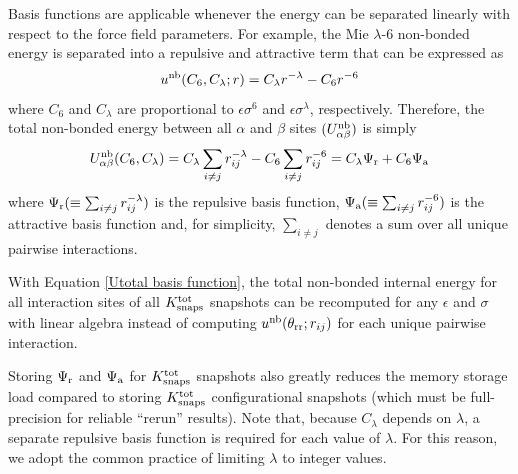 \documentclass[journal=jced,manuscript=article]{achemso}
\begin{document}
Basis functions are applicable whenever the energy can be separated linearly with respect to the force field parameters. For example, the Mie $\lambda$-6 non-bonded energy is separated into a repulsive and attractive term that can be expressed as
\begin{equation} \label{Mie basis function}
u^{\rm nb}(C_6,C_\lambda;r) = C_\lambda r^{-\lambda} - C_6 r^{-6}
\end{equation} 
where $C_6$ and $C_\lambda$ are proportional to $\epsilon \sigma^6$ and $\epsilon \sigma^\lambda$, respectively. Therefore, the total non-bonded energy between all $\alpha$ and $\beta$ sites $(U_{\alpha\beta}^{\rm nb})$ is simply
\begin{equation} \label{Utotal basis function}
U_{\alpha\beta}^{\rm nb}(C_6,C_\lambda) = C_\lambda \sum_{i \neq j} r_{ij}^{-\lambda} - C_6 \sum_{i \neq j} r_{ij}^{-6} = C_\lambda \Psi_{\rm r} + C_6 \Psi_{\rm a}
\end{equation}
where $\Psi_{\rm r} (\equiv \sum_{i \neq j} r_{ij}^{-\lambda})$ is the repulsive basis function, $\Psi_{\rm a} (\equiv \sum_{i \neq j} r_{ij}^{-6})$ is the attractive basis function and, for simplicity, $\sum_{i \neq j}$ denotes a sum over all unique pairwise interactions.

With Equation \ref{Utotal basis function}, the total non-bonded internal energy for all interaction sites of all $K^{\rm tot}_{\rm snaps}$ snapshots can be recomputed for any $\epsilon$ and $\sigma$ with linear algebra instead of computing $u^{\rm nb}(\theta_{\rm rr};r_{ij})$ for each unique pairwise interaction. 

Storing $\Psi_{\rm r}$ and $\Psi_{\rm a}$ for $K^{\rm tot}_{\rm snaps}$ snapshots also greatly reduces the memory storage load compared to storing $K^{\rm tot}_{\rm snaps}$ configurational snapshots (which must be full-precision for reliable ``rerun'' results). Note that, because $C_\lambda$ depends on $\lambda$, a separate repulsive basis function is required for each value of $\lambda$. For this reason, we adopt the common practice of limiting $\lambda$ to integer values.


%
%
%
\end{document}
